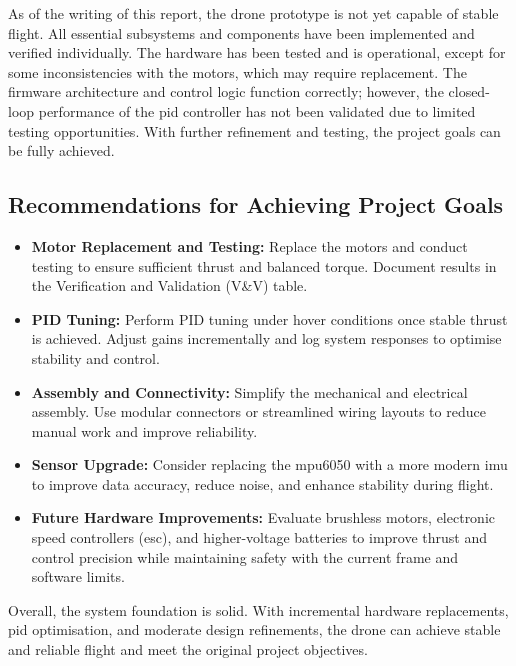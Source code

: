 As of the writing of this report, the drone prototype is not yet capable of stable flight. All essential subsystems and components have been implemented and verified individually. The hardware has been tested and is operational, except for some inconsistencies with the motors, which may require replacement. The firmware architecture and control logic function correctly; however, the closed-loop performance of the \gls{pid} controller has not been validated due to limited testing opportunities. With further refinement and testing, the project goals can be fully achieved.

\subsection*{Recommendations for Achieving Project Goals}

\begin{itemize}
    \item \textbf{Motor Replacement and Testing:} Replace the motors and conduct testing to ensure sufficient thrust and balanced torque. Document results in the Verification and Validation (V\&V) table.
    
    \item \textbf{PID Tuning:} Perform PID tuning under hover conditions once stable thrust is achieved. Adjust gains incrementally and log system responses to optimise stability and control.
    
    \item \textbf{Assembly and Connectivity:} Simplify the mechanical and electrical assembly. Use modular connectors or streamlined wiring layouts to reduce manual work and improve reliability.
    
    \item \textbf{Sensor Upgrade:} Consider replacing the \gls{mpu6050} with a more modern \gls{imu} to improve data accuracy, reduce noise, and enhance stability during flight.
    
    \item \textbf{Future Hardware Improvements:} Evaluate brushless motors, electronic speed controllers (\gls{esc}), and higher-voltage batteries to improve thrust and control precision while maintaining safety with the current frame and software limits.
\end{itemize}

Overall, the system foundation is solid. With incremental hardware replacements, \gls{pid} optimisation, and moderate design refinements, the drone can achieve stable and reliable flight and meet the original project objectives.
